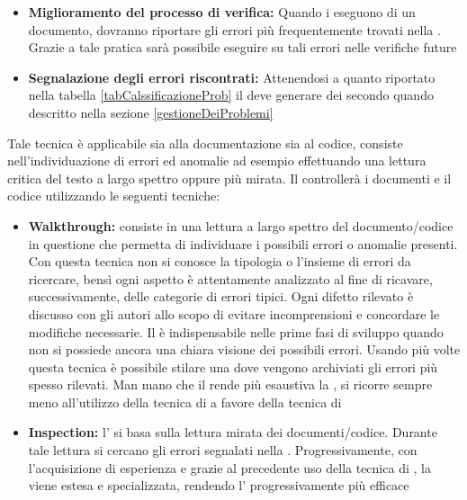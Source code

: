 \documentclass[12pt,a4paper]{article}
\begin{document}
\begin{itemize}
	\item \textbf{Miglioramento del processo di verifica:} Quando i \VRpl{} eseguono  di un documento, dovranno riportare gli errori più frequentemente trovati nella . Grazie a tale pratica sarà possibile eseguire  su tali errori nelle verifiche future
	\item \textbf{Segnalazione degli errori riscontrati:} Attenendosi a quanto riportato nella tabella \ref{tabCalssificazioneProb} il \VR{} deve generare dei  secondo quando descritto nella sezione \ref{gestioneDeiProblemi}
\end{itemize}

\TODO{}

\TODO{}

Tale tecnica è applicabile sia alla documentazione sia al codice, consiste nell'individuazione di errori ed anomalie ad esempio effettuando una lettura critica del testo a largo spettro oppure più mirata. Il \VR{} controllerà i documenti e il codice utilizzando le seguenti tecniche:
\begin{itemize}
	\item \textbf{Walkthrough:} consiste in una lettura a largo spettro del documento/codice in questione che permetta di individuare i possibili errori o anomalie presenti. Con questa tecnica non si conosce la tipologia o l'insieme di errori da ricercare, bensì ogni aspetto è attentamente analizzato al fine di ricavare, successivamente, delle categorie di errori tipici. Ogni difetto rilevato è discusso con gli autori allo scopo di evitare incomprensioni e concordare le modifiche necessarie. Il  è indispensabile nelle prime fasi di sviluppo quando non si possiede ancora una chiara visione dei possibili errori. Usando più volte questa tecnica è possibile stilare una  dove vengono archiviati gli errori più spesso rilevati. Man mano che il \VR{} rende più esaustiva la , si ricorre sempre meno all'utilizzo della tecnica di  a favore della tecnica di 
	\item \textbf{Inspection:} l' si basa sulla lettura mirata dei documenti/codice. Durante tale lettura si cercano gli errori segnalati nella . Progressivamente, con l'acquisizione di esperienza e grazie al precedente uso della tecnica di , la  viene estesa e specializzata, rendendo l' progressivamente più efficace
\end{itemize}
\end{document}
